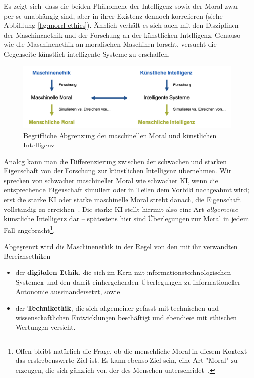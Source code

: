 \documentclass[twocolumn, german]{tum-article}
\begin{document}
Es zeigt sich, dass die beiden Phänomene der Intelligenz sowie der Moral zwar per se unabhängig sind, aber in ihrer Existenz dennoch korrelieren (siehe Abbildung \vref{fig:moral-ethics}).
Ähnlich verhält es sich auch mit den Disziplinen der Maschinenethik und der Forschung an der künstlichen Intelligenz.
Genauso wie die Maschinenethik an moralischen Maschinen forscht, versucht die Gegenseite künstlich intelligente Systeme zu erschaffen.

\begin{figure}
	\includegraphics[width=\textwidth]{media/eth-int}
	\caption{Begriffliche Abgrenzung der maschinellen Moral und künstlichen Intelligenz~\cite[S. 17]{bendel-mascheth}.}
	\label{fig:moral-ethics}
\end{figure}

Analog kann man die Differenzierung zwischen der schwachen und starken Eigenschaft von der Forschung zur künstlichen Intelligenz übernehmen.
Wir sprechen von schwacher maschineller Moral wie schwacher KI, wenn die entsprechende Eigenschaft simuliert oder in Teilen dem Vorbild nachgeahmt wird; erst die starke KI oder starke maschinelle Moral strebt danach, die Eigenschaft vollständig zu erreichen~\cite[S. 17]{bendel-mascheth}.
Die starke KI stellt hiermit also eine Art \emph{allgemeine} künstliche Intelligenz dar -- spätestens hier sind Überlegungen zur Moral in jedem Fall angebracht\footnote{Offen bleibt natürlich die Frage, ob die menschliche Moral in diesem Kontext das erstrebenswerte Ziel ist. Es kann ebenso Ziel sein, eine Art "Moral" zu erzeugen, die sich gänzlich von der des Menschen unterscheidet~\cite[S. 23]{bendel-mascheth}.}.

Abgegrenzt wird die Maschinenethik in der Regel von den mit ihr verwandten Bereichsethiken
\begin{itemize}
	\item der \textbf{digitalen Ethik}, die sich im Kern mit informationstechnologischen Systemen und den damit einhergehenden Überlegungen zu informationeller Autonomie auseinandersetzt, sowie
	\item der \textbf{Technikethik}, die sich allgemeiner gefasst mit technischen und wissenschaftlichen Entwicklungen beschäftigt und ebendiese mit ethischen Wertungen versieht.
\end{itemize}
\end{document}
